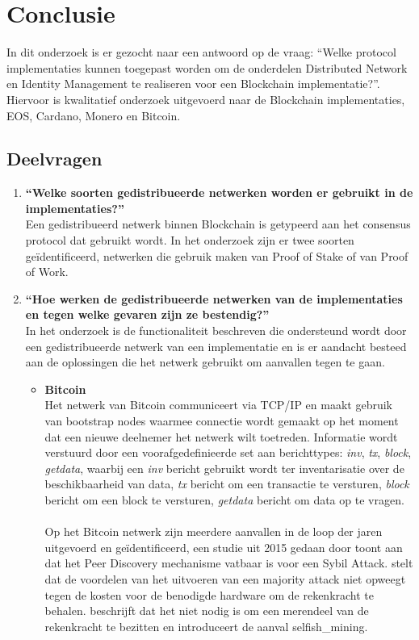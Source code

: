 \newpage
\chapter{Conclusie}

In dit onderzoek is er gezocht naar een antwoord op de vraag: ``Welke protocol implementaties kunnen toegepast worden om de onderdelen Distributed Network en Identity Management te realiseren voor een Blockchain implementatie?''. Hiervoor is kwalitatief onderzoek uitgevoerd naar de Blockchain implementaties, EOS, Cardano, Monero en Bitcoin.

\section{Deelvragen}

\begin{enumerate}
  \item \textbf{``Welke soorten gedistribueerde netwerken worden er gebruikt in de implementaties?''}
  \\ Een gedistribueerd netwerk binnen Blockchain is getypeerd aan het consensus protocol dat gebruikt wordt. In het onderzoek zijn er twee soorten geïdentificeerd, netwerken die gebruik maken van Proof of Stake of van Proof of Work.
  
  \newpage
  \item \textbf{``Hoe werken de gedistribueerde netwerken van de implementaties en tegen welke gevaren zijn ze bestendig?''}
  \\ In het onderzoek is de functionaliteit beschreven die ondersteund wordt door een gedistribueerde netwerk van een implementatie en is er aandacht besteed aan de oplossingen die het netwerk gebruikt om aanvallen tegen te gaan. 
  \begin{itemize}
    \item \textbf{Bitcoin}
    \\ Het netwerk van Bitcoin communiceert via TCP/IP en maakt gebruik van bootstrap nodes waarmee connectie wordt gemaakt op het moment dat een nieuwe deelnemer het netwerk wilt toetreden. Informatie wordt verstuurd door een voorafgedefinieerde set aan berichttypes: \textit{inv}, \textit{tx}, \textit{block}, \textit{getdata}, waarbij een \textit{inv} bericht gebruikt wordt ter inventarisatie over de beschikbaarheid van data, \textit{tx} bericht om een transactie te versturen, \textit{block} bericht om een block te versturen, \textit{getdata} bericht om data op te vragen. \\ \\ Op het Bitcoin netwerk zijn meerdere aanvallen in de loop der jaren uitgevoerd en geïdentificeerd, een studie uit 2015 gedaan door \cite{heilman2015eclipse} toont aan dat het Peer Discovery mechanisme vatbaar is voor een Sybil Attack. \cite{nakamoto2008bitcoin} stelt dat de voordelen van het uitvoeren van een majority attack niet opweegt tegen de kosten voor de benodigde hardware om de rekenkracht te behalen. \cite{eyal2014majority} beschrijft dat het niet nodig is om een merendeel van de rekenkracht te bezitten en introduceert de aanval \gls{selfish_mining}.


\end{itemize}
\end{enumerate}

